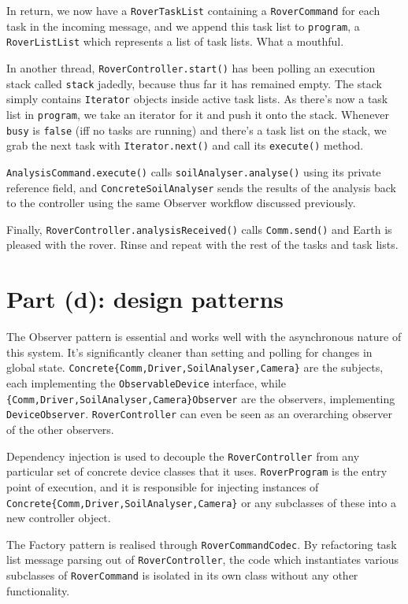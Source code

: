 \documentclass[a4paper,titlepage,12pt]{article}
\begin{document}
In return, we now have a \texttt{RoverTaskList} containing a
\texttt{RoverCommand} for each task in the incoming message, and we
append this task list to \texttt{program}, a \texttt{RoverListList}
which represents a list of task lists. What a mouthful.

In another thread, \texttt{RoverController.start()} has been polling
an execution stack called \texttt{stack} jadedly, because thus far it
has remained empty. The stack simply contains \texttt{Iterator} objects
inside active task lists. As there's now a task list in
\texttt{program}, we take an iterator for it and push it onto the
stack. Whenever \texttt{busy} is \texttt{false} (iff no tasks are
running) and there's a task list on the stack, we grab the next task
with \texttt{Iterator.next()} and call its \texttt{execute()} method.

\texttt{AnalysisCommand.execute()} calls
\texttt{soilAnalyser.analyse()} using its private reference field, and
\texttt{ConcreteSoilAnalyser} sends the results of the analysis back to
the controller using the same Observer workflow discussed previously.

Finally, \texttt{RoverController.analysisReceived()} calls
\texttt{Comm.send()} and Earth is pleased with the rover. Rinse and
repeat with the rest of the tasks and task lists.

\section{Part (d): design patterns}

The Observer pattern is essential and works well with the asynchronous
nature of this system. It's significantly cleaner than setting and
polling for changes in global state.
\texttt{Concrete\{Comm,Driver,SoilAnalyser,Camera\}} are the subjects,
each implementing the \texttt{ObservableDevice} interface, while
\texttt{\{Comm,Driver,SoilAnalyser,Camera\}Observer} are the observers,
implementing \texttt{DeviceObserver}. \texttt{RoverController} can even
be seen as an overarching observer of the other observers.

Dependency injection is used to decouple the \texttt{RoverController}
from any particular set of concrete device classes that it uses.
\texttt{RoverProgram} is the entry point of execution, and it is
responsible for injecting instances of
\texttt{Concrete\{Comm,Driver,SoilAnalyser,Camera\}} or any subclasses
of these into a new controller object.

The Factory pattern is realised through \texttt{RoverCommandCodec}. By
refactoring task list message parsing out of \texttt{RoverController},
the code which instantiates various subclasses of \texttt{RoverCommand}
is isolated in its own class without any other functionality.
\end{document}
